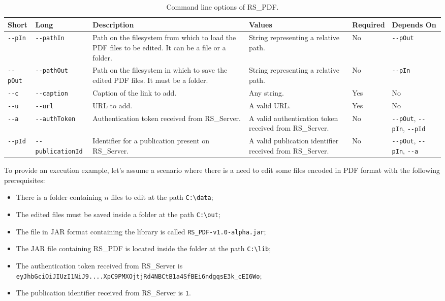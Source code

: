 \documentclass[a4paper, english]{article}
\newcommand{\rsserver}{RS\_Server\xspace}
\newcommand{\rspdf}{RS\_PDF\xspace}
\begin{document}
\begin{table}
\centering
\begin{threeparttable}
\begin{tabular}{p{1cm}p{3cm}p{3cm}p{3cm}p{2cm}p{2cm}}
\toprule
\textbf{Short} & \textbf{Long} & \textbf{Description} & \textbf{Values} & \textbf{Required} & \textbf{Depends On} \\
\midrule
\verb|--pIn| & \verb|--pathIn| & Path on the filesystem from which to load the PDF files to be edited. It can be a file or a folder. & String representing a relative path. & No & \verb|--pOut| \\
\midrule
\verb|--pOut| & \verb|--pathOut| & Path on the filesystem in which to save the edited PDF files. It must be a folder. & String representing a relative path. & No & \verb|--pIn| \\
\midrule
\verb|--c| & \verb|--caption| & Caption of the link to add. & Any string. & Yes & No \\
\midrule
\verb|--u| & \verb|--url| & URL to add. & A valid URL. & Yes & No \\
\midrule
\verb|--a| & \verb|--authToken| & Authentication token received from \rsserver. & A valid authentication token received from \rsserver. & No & \verb|--pOut|, \verb|--pIn|, \verb|--pId| \\
\midrule
\verb|--pId| & \verb|--publicationId| & Identifier for a publication present on \rsserver. & A valid publication identifier received from \rsserver. & No & \verb|--pOut|, \verb|--pIn|, \verb|--a| \\
\bottomrule
\end{tabular}
\caption{Command line options of \rspdf.}
\label{tab:cli}
\end{threeparttable}
\end{table}

To provide an execution example, let's assume a scenario where there is a need to edit some files encoded in PDF format with the following prerequisites:

\begin{itemize}
    \item There is a folder containing $n$ files to edit at the path \verb|C:\data|;
    \item The edited files must be saved inside a folder at the path \verb|C:\out|;
    \item The file in JAR format containing the library is called \verb|RS_PDF-v1.0-alpha.jar|;
    \item The JAR file containing \rspdf is located inside the folder at the path \verb|C:\lib|;
    \item The authentication token received from \rsserver is \\
    \verb|eyJhbGciOiJIUzI1NiJ9....XpC9PMXOjtjRd4NBCtB1a4SfBEi6ndgqsE3k_cEI6Wo|;
    \item The publication identifier received from \rsserver is \verb|1|.
\end{itemize}
\end{document}
